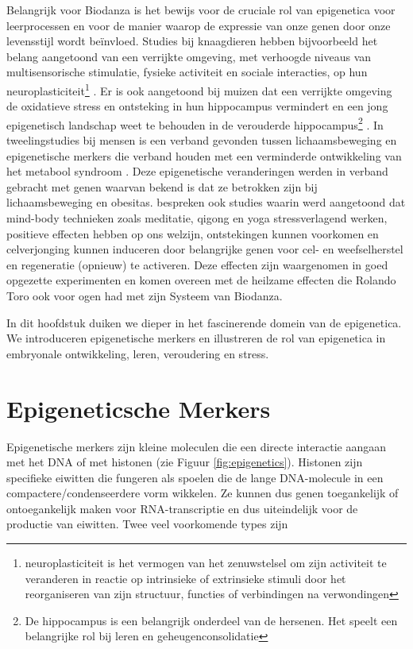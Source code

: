 \documentclass[
  11pt,
]{book}
\begin{document}
Belangrijk voor Biodanza is het bewijs voor de cruciale rol van epigenetica voor leerprocessen en voor de manier waarop de expressie van onze genen door onze levensstijl wordt beïnvloed.
Studies bij knaagdieren hebben bijvoorbeeld het belang aangetoond van een verrijkte omgeving, met verhoogde niveaus van multisensorische stimulatie, fysieke activiteit en sociale interacties, op hun neuroplasticiteit\footnote{neuroplasticiteit is het vermogen van het zenuwstelsel om zijn activiteit te veranderen in reactie op intrinsieke of extrinsieke stimuli door het reorganiseren van zijn structuur, functies of verbindingen na verwondingen} \citep{baroncelli2010}. Er is ook aangetoond bij muizen dat een verrijkte omgeving de oxidatieve stress en ontsteking in hun hippocampus vermindert \citep{grinan2016} en een jong epigenetisch landschap weet te behouden in de verouderde hippocampus\footnote{De hippocampus is een belangrijk onderdeel van de hersenen. Het speelt een belangrijke rol bij leren en geheugenconsolidatie} \citep{zocher2021}.
In tweelingstudies bij mensen is een verband gevonden tussen lichaamsbeweging en epigenetische merkers die verband houden met een verminderde ontwikkeling van het metabool syndroom \citep{Duncan2022}. Deze epigenetische veranderingen werden in verband gebracht met genen waarvan bekend is dat ze betrokken zijn bij lichaamsbeweging en obesitas. \citet{BlackburnEpel2017} bespreken ook studies waarin werd aangetoond dat mind-body technieken zoals meditatie, qigong en yoga stressverlagend werken, positieve effecten hebben op ons welzijn, ontstekingen kunnen voorkomen en celverjonging kunnen induceren door belangrijke genen voor cel- en weefselherstel en regeneratie (opnieuw) te activeren. Deze effecten zijn waargenomen in goed opgezette experimenten en komen overeen met de heilzame effecten die Rolando Toro ook voor ogen had met zijn Systeem van Biodanza.

In dit hoofdstuk duiken we dieper in het fascinerende domein van de epigenetica. We introduceren epigenetische merkers en illustreren de rol van epigenetica in embryonale ontwikkeling, leren, veroudering en stress.

\hypertarget{epigeneticsche-merkers}{%
\section{Epigeneticsche Merkers}\label{epigeneticsche-merkers}}

Epigenetische merkers zijn kleine moleculen die een directe interactie aangaan met het DNA of met histonen (zie Figuur \ref{fig:epigenetics}). Histonen zijn specifieke eiwitten die fungeren als spoelen die de lange DNA-molecule in een compactere/condenseerdere vorm wikkelen. Ze kunnen dus genen toegankelijk of ontoegankelijk maken voor RNA-transcriptie en dus uiteindelijk voor de productie van eiwitten. Twee veel voorkomende types zijn
\end{document}
